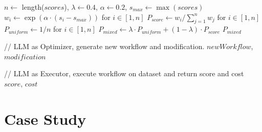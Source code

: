 \documentclass{article} %
\theoremstyle{plain}
\theoremstyle{definition}
\theoremstyle{remark}
\begin{document}
\begin{algorithm}
\begin{algorithmic}[1]
    \State $n \gets$ length($scores$), $\lambda \gets 0.4$, $\alpha \gets 0.2$, $s_{max} \gets \max(scores)$
    \State $w_i \gets \exp(\alpha \cdot (s_i - s_{max}))$ for $i \in [1,n]$
    \State $P_{score} \gets w_i / \sum_{j=1}^n w_j$ for $i \in [1,n]$
    \State $P_{uniform} \gets 1/n$ for $i \in [1,n]$
    \State $P_{mixed} \gets \lambda \cdot P_{uniform} + (1-\lambda) \cdot P_{score}$
    \State \Return $P_{mixed}$
\EndProcedure

    \State // LLM as Optimizer, generate new workflow and modification.
    \State \Return $newWorkflow$, $modification$
\EndProcedure

    \State // LLM as Executor, execute workflow on dataset and return score and cost
    \State \Return $score$, $cost$
\EndProcedure
\end{algorithmic}
\end{algorithm}

\clearpage

\section{Case Study}
\label{appendix:case_study}
\end{document}
